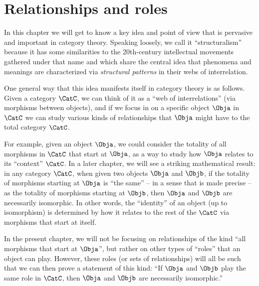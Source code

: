 
\section{Relationships and roles}\label{sec:relationships}


In this chapter we will get to know a key idea and point of view that is pervasive and important in category theory. Speaking loosely, we call it ``structuralism'' because it has some similarities to the 20th-century intellectual movements gathered under that name and which share the central idea that phenomena and meanings are characterized via \emph{structural patterns} in their webs of interrelation. 

One general way that this idea manifests itself in category theory is as follows. Given a category $\CatC$, we can think of it as a ``web of interrelations'' (via morphisms between objects), and if we focus in on a specific object $\Obja$ in $\CatC$ we can study various kinds of relationships that $\Obja$ might have to the total category $\CatC$. 


For example, given an object $\Obja$, we could consider the totality of all morphisms in $\CatC$ that start at $\Obja$, as a way to study how $\Obja$ relates to its ``context'' $\CatC$. In a later chapter, we will see a striking mathematical result: in any category $\CatC$, when given two objects $\Obja$ and $\Objb$, if the totality of morphisms starting at $\Obja$ is ``the same'' -- in a sense that is made precise -- as the totality of morphisms starting at $\Objb$, then $\Obja$ and $\Objb$ are necessarily isomorphic. In other words, the ``identity'' of an object (up to isomorphism) is determined by how it relates to the rest of the $\CatC$ via morphisms that start at itself. 


In the present chapter, we will not be focusing on relationships of the kind ``all morphisms that start at $\Obja$'', but rather on other types of ``roles'' that an object can play. However, these roles (or sets of relationships) will all be such that we can then prove a statement of this kind: ``If $\Obja$ and $\Objb$ play the same role in $\CatC$, then $\Obja$ and $\Objb$ are necessarily isomorphic.'' 